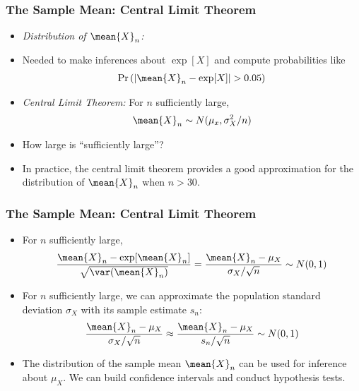 \begin{frame}
\frametitle{The Sample Mean: Central Limit Theorem} 
\begin{itemize}
\item \emph{Distribution of $\mean{X}_n$:}
\item Needed to make inferences about $\exp[X]$ and compute probabilities like
\begin{align*}
\Pr\left(|\mean{X}_n - \exp[X]| > 0.05\right)
\end{align*} 
\item \emph{Central Limit Theorem:} For $n$ sufficiently large,
\begin{align*}\mean{X}_n \sim N(\mu_x, \sigma_X^2/n)
\end{align*}
\item How large is ``sufficiently large''? 
\item In practice, the central limit theorem provides a good approximation for the distribution of $\mean{X}_n$ when $n > 30$.
\end{itemize}
\end{frame}


\begin{frame}
\frametitle{The Sample Mean: Central Limit Theorem} 
\begin{itemize}
\item For $n$ sufficiently large, 
\begin{align*}
\frac{\mean{X}_n - \exp[\mean{X}_n]}{\sqrt{\var(\mean{X}_n)}} 
    = \frac{\mean{X}_n -\mu_X}{\sigma_X/\sqrt{n}} 
      \sim N(0,1)
\end{align*} 
\item For $n$ sufficiently large, we can approximate the population standard deviation $\sigma_X$ with its sample estimate $s_n$:
\begin{align*}
\frac{\mean{X}_n - \mu_X}{\sigma_X/\sqrt{n}}
    \approx  
    \frac{\mean{X}_n - \mu_X}{s_n/\sqrt{n}}
    \sim N(0,1)  
\end{align*} 
\item The distribution of the sample mean $\mean{X}_n$ can be used for inference about $\mu_X$. We can build confidence intervals and conduct hypothesis tests.
\end{itemize}
\end{frame}


